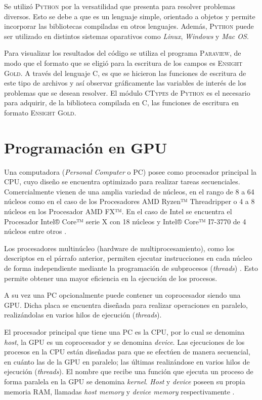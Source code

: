 Se utilizó \textsc{Python} por la versatilidad que presenta para resolver problemas diversos. Esto se debe a que es un lenguaje simple, orientado a objetos y permite incorporar las bibliotecas compiladas en otros lenguajes. Además, \textsc{Python} puede ser utilizado en distintos sistemas oparativos como \textit{Linux}, \textit{Windows} y \textit{Mac OS}. 

Para visualizar los resultados del código se utiliza el programa \textsc{Paraview}, de modo que el formato que se eligió para la escritura de los campos es \textsc{Ensight Gold}. A través del lenguaje \textsc{C}, es que se hicieron las funciones de escritura de este tipo de archivos y así observar gráficamente las variables de interés de los problemas que se desean resolver. El módulo \textsc{CTypes} de \textsc{Python} es el necesario para adquirir, de la biblioteca compilada en \textsc{C}, las funciones de escritura en formato \textsc{Ensight Gold}.



\section{Programación en GPU}
\label{sec_pc}

Una computadora (\textit{Personal Computer} o PC) posee como procesador principal la CPU, cuyo diseño se encuentra optimizado para realizar tareas secuenciales. Comercialmente vienen de una amplia variedad de núcleos, en el rango de 8 a 64 núcleos como en el caso de los Procesadores AMD Ryzen™ Threadripper o 4 a 8 núcleos en los Procesador AMD FX™. En el caso de Intel se encuentra el Procesador Intel® Core™ serie X con 18 núcleos y  Intel® Core™ I7-3770 de 4 núcleos entre otros \cite{edp:2020:amd} \cite{icp:2020:intel}.

Los procesadores multinúcleo  (hardware de multiprocesamiento), como los descriptos en el párrafo anterior, permiten ejecutar instrucciones en cada núcleo  de forma independiente mediante la programación de subprocesos (\textit{threads}) \cite{rajagopal1999introduction}. Esto permite obtener una mayor eficiencia en la ejecución de los procesos.

A su vez una PC opcionalmente puede contener un coprocesador siendo una GPU. Dicha placa se encuentra diseñada para realizar operaciones en paralelo, realizándolas en varios hilos de ejecución (\textit{threads}).


El procesador principal que tiene una PC es la CPU, por lo cual se denomina \textit{host}, la GPU es un coprocesador y se denomina \textit{device}. Las ejecuciones de los procesos en la CPU están diseñadas para que se efectúen de manera secuencial, en cuánto las de la GPU en paralelo; las últimas realizándose en varios hilos de ejecución (\textit{threads}). El nombre que recibe una función que ejecuta un proceso de forma paralela en la GPU se denomina \textit{kernel}. \textit{Host} y \textit{device} poseen su propia memoria RAM, llamadas \textit{host memory} y \textit{device memory} respectivamente \cite{rinaldi2011modelos}.

